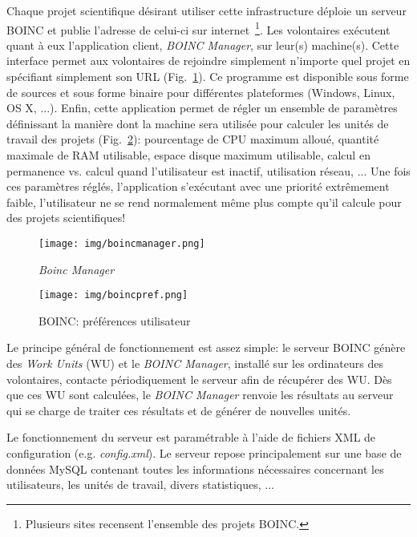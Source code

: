 \documentclass[a4paper, 11pt]{report}
\begin{document}
Chaque projet scientifique désirant utiliser cette infrastructure déploie un serveur \textsc{BOINC} et publie l'adresse de celui-ci sur internet~\footnote{Plusieurs sites recensent l'ensemble des projets \textsc{BOINC}.}. %
Les volontaires exécutent quant à eux l'application client, \textit{BOINC Manager}, sur leur(s) machine(s). Cette interface permet aux volontaires de rejoindre simplement n'importe quel projet en spécifiant simplement son URL (Fig.~\ref{boincmanager}). Ce programme est disponible sous forme de sources et sous forme binaire pour différentes plateformes (Windows, Linux, OS X, ...). Enfin, cette application permet de régler un ensemble de paramètres définissant la manière dont la machine sera utilisée pour calculer les unités de travail des projets (Fig.~\ref{boincpref}): pourcentage de CPU maximum alloué, quantité maximale de RAM utilisable, espace disque maximum utilisable, calcul en permanence vs. calcul quand l'utilisateur est inactif, utilisation réseau, ... Une fois ces paramètres réglés, l'application s'exécutant avec une priorité extrêmement faible, l'utilisateur ne se rend normalement même plus compte qu'il calcule pour des projets scientifiques!

\begin{figure}[!h]
\centering
\texttt{[image: img/boincmanager.png]}
\caption{\textit{Boinc Manager}}
\label{boincmanager}
\end{figure}

\begin{figure}[!h]
\centering
\texttt{[image: img/boincpref.png]}
\caption{\textsc{BOINC}: préférences utilisateur}
\label{boincpref}
\end{figure}

Le principe général de fonctionnement est assez simple: le serveur \textsc{BOINC} génère des \textit{Work Units} (WU) et le \textit{BOINC Manager}, installé sur les ordinateurs des volontaires, contacte périodiquement le serveur afin de récupérer des WU. Dès que ces WU sont calculées, le \textit{BOINC Manager} renvoie les résultats au serveur qui se charge de traiter ces résultats et de générer de nouvelles unités. 

Le fonctionnement du serveur est paramétrable à l'aide de fichiers XML de configuration (e.g. \textit{config.xml}). Le serveur repose principalement sur une base de données MySQL contenant toutes les informations nécessaires concernant les utilisateurs, les unités de travail, divers statistiques, ...
\end{document}
